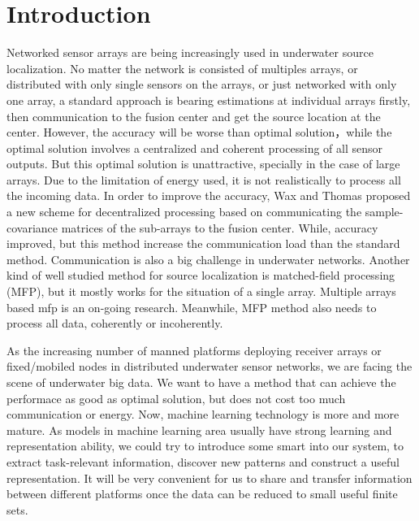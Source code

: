 \section{Introduction}
Networked sensor arrays are being increasingly used in underwater source localization\cite{roan2009distributed}.
No matter the network is consisted of multiples arrays, or distributed
with only single sensors on the arrays, or just networked with only one array\cite{erling2007performance}, a standard approach is bearing estimations at individual arrays firstly, then communication to the fusion center and get the source location at the center\cite{tenney1984distributed,bar1995multitarget,ristic2001influence,kaplan2001bearings}. However, the accuracy will be worse than optimal solution，while the optimal solution involves a centralized and coherent processing of all sensor outputs\cite{schweppe1968sensor}. But this optimal solution is unattractive, specially in the case of large arrays. Due to the limitation of energy used, it is not realistically to process all the incoming data.
In order to improve the accuracy, Wax and Thomas proposed a new scheme for decentralized processing based on communicating the sample-covariance matrices of the sub-arrays to the fusion center\cite{wax1985decentralized}. While, accuracy improved, but this method increase the communication load than the standard method. Communication is also a big challenge in underwater networks. Another kind of well studied method for source localization 
is matched-field processing (MFP)\cite{tolstoy1993matched,baggeroer1988matched,baggeroer1993overview}, but it mostly works for the situation of a single array. Multiple arrays based mfp is an on-going research\cite{nichols2015cross,tollefsen2017multiple}. Meanwhile, MFP method also needs to process all data, coherently or incoherently. 

As the increasing number of manned platforms deploying receiver arrays or fixed/mobiled nodes in distributed underwater sensor networks, we are facing the scene of underwater big data\cite{Yang2015Issues}. 
We want to have a method that can achieve the performace as good as optimal solution, but does not cost too much communication or energy. 
Now, machine learning technology is more and more mature. As models in machine learning area usually have strong learning and representation ability, we could try to introduce some smart into our system, to extract task-relevant information, discover new patterns and construct a useful representation.
It will be very convenient for us to share and transfer information between different platforms once the data can be reduced to small useful finite sets.

